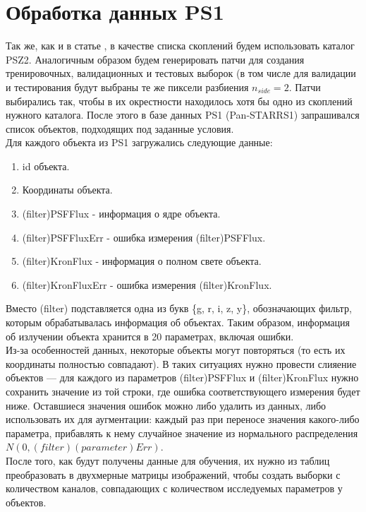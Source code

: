 \section{Обработка данных PS1}
Так же, как и в статье \cite{Bonjean}, в качестве списка скоплений будем использовать каталог PSZ2. 
Аналогичным образом будем генерировать патчи для создания тренировочных, валидационных и тестовых 
выборок (в том числе для валидации и тестирования будут выбраны те же пиксели разбиения $n_{side}=2$. 
Патчи выбирались так, чтобы в их окрестности находилось хотя бы одно из скоплений нужного каталога. 
После этого в базе данных PS1 (Pan-STARRS1) запрашивался список объектов, подходящих под заданные 
условия. \\

Для каждого объекта из PS1 загружались следующие данные:
\begin{enumerate}
    \item id объекта.
    \item Координаты объекта.
    \item (filter)PSFFlux - информация о ядре объекта.
    \item (filter)PSFFluxErr - ошибка измерения (filter)PSFFlux.
    \item (filter)KronFlux - информация о полном свете объекта.
    \item (filter)KronFluxErr - ошибка измерения (filter)KronFlux.
\end{enumerate}

Вместо (filter) подставляется одна из букв \{g, r, i, z, y\}, обозначающих фильтр, которым 
обрабатывалась информация об объектах. Таким образом, информация об излучении объекта хранится в 
20 параметрах, включая ошибки.\\

Из-за особенностей данных, некоторые объекты могут повторяться (то есть их координаты полностью 
совпадают). В таких ситуациях нужно провести слияение объектов --- для каждого из параметров 
(filter)PSFFlux и (filter)KronFlux нужно сохранить значение из той строки, где ошибка 
соответствующего измерения будет ниже. Оставшиеся значения ошибок можно либо удалить из данных, 
либо использовать их для аугментации: 
каждый раз при переносе значения какого-либо параметра, прибавлять к нему случайное значение из 
нормального распределения $N(0, (filter)(parameter)Err)$.\\

После того, как будут получены данные для обучения, их нужно из таблиц преобразовать в двухмерные 
матрицы изображений, чтобы создать выборки с количеством каналов, совпадающих с количеством 
исследуемых параметров у объектов. \\

